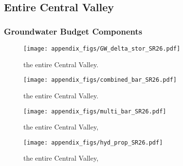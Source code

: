 \newcommand{\LSCombinedTextOne}{Annual landscape water budget components from C2VSim and CVHM for }
\newcommand{\LSCombinedTextTwo}{ Flows into the landscape include precipitation, surface water diversions, and groundwater pumping. Flows out include runoff and return flows, actual evapotranspiration ($ETa$), and deep percolation (i.e., recharge) to the groundwater system.}

\newcommand{\LSMultiTextOne}{Comparison of similar annual landscape water budget components from C2VSim and CVHM for }
\newcommand{\LSMultiTextTwo}{ including similar flow components and total flows into (A) and out of (B) the landscape, along with statistical measures of the correspondence between similar flow components for each model (C), including normalized root mean square error (NRMSE), correlation (Pearson's $r$), and normalized mean bias (NMB).}


\subsection{Entire Central Valley}
\subsubsection{Groundwater Budget Components}
\begin{figure}[h]
\centerline{\texttt{[image: appendix\_figs/GW\_delta\_stor\_SR26.pdf]}}
\caption{\GWBudgetText the entire Central Valley.}
\label{fig:delta_stor_SR26}
\end{figure}
\newpage

\begin{figure}[ht]
\centerline{\texttt{[image: appendix\_figs/combined\_bar\_SR26.pdf]}}
\caption{\GWCombinedTextOne the entire Central Valley.\GWCombinedTextTwo}
\label{fig:GW_budget_SR26}
\end{figure}
\newpage

\begin{landscape}
\begin{figure}[ht]
\centerline{\texttt{[image: appendix\_figs/multi\_bar\_SR26.pdf]}}
\caption{\GWMultiTextOne the entire Central Valley,\GWMultiTextTwo}
\label{fig:multi_GW_budget_SR26}
\end{figure}
\newpage

\begin{figure}[ht]
\centerline{\texttt{[image: appendix\_figs/hyd\_prop\_SR26.pdf]}}
\caption{\HydPropOne the entire Central Valley,\HydPropTwo}
\label{fig:hyd_prop_SR26}
\end{figure}
\newpage
\end{landscape}

